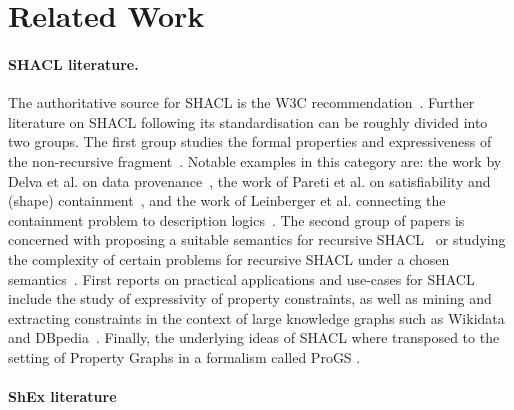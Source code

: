 \section{Related Work}
\paragraph{SHACL literature.} The authoritative source for SHACL is the W3C recommendation~\cite{KK17}.
Further literature on SHACL following its standardisation can be roughly divided into two groups. The first group studies the formal properties and expressiveness of the non-recursive fragment~\cite{BJVdB24}. Notable examples in this category are: the work by Delva et al. on data provenance~\cite{DDJB23}, the work of Pareti et al. on satisfiability and (shape) containment~\cite{PKMN20}, and the work of Leinberger et al. connecting the containment problem to description logics~\cite{LSRLS20}.
The second group of papers is concerned with proposing a suitable semantics for recursive SHACL~\cite{CRS18,CFRS19,ACORSS20,BJ21} or studying the complexity of certain problems for recursive SHACL under a chosen semantics~\cite{PKM22}. First reports on practical applications and use-cases for SHACL include the study of expressivity of property constraints, as well as  mining and extracting constraints in the context of large knowledge graphs such as Wikidata and DBpedia~\cite{FSAP24,RLH23}. Finally, the underlying ideas of SHACL where transposed to the setting of Property Graphs in a formalism called ProGS \cite{ProGS}.

\paragraph{ShEx literature}

